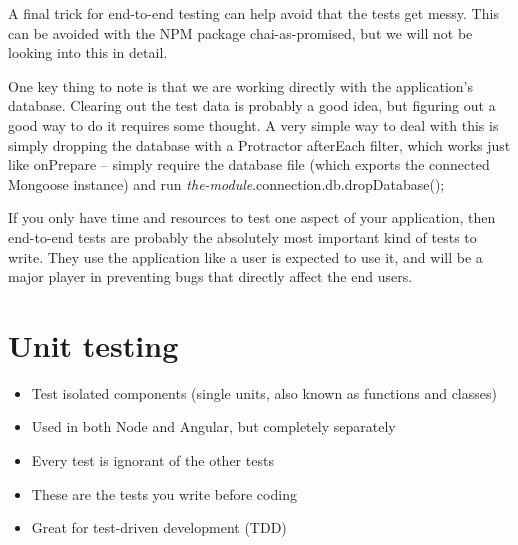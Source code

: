 \documentclass[british]{article}
\begin{document}
A final trick for end-to-end testing can help avoid that the tests get messy. This can be avoided with the NPM package chai-as-promised, but we will not be looking into this in detail.

One key thing to note is that we are working directly with the application's database. Clearing out the test data is probably a good idea, but figuring out a good way to do it requires some thought. A very simple way to deal with this is simply dropping the database with a Protractor afterEach filter, which works just like onPrepare – simply require the database file (which exports the connected Mongoose instance) and run \textit{the-module}.connection.db.dropDatabase();

If you only have time and resources to test one aspect of your application, then end-to-end tests are probably the absolutely most important kind of tests to write. They use the application like a user is expected to use it, and will be a major player in preventing bugs that directly affect the end users.

\section{Unit testing}

\begin{itemize}
  \item Test isolated components (single units, also known as functions and classes)
  \item Used in both Node and Angular, but completely separately
  \item Every test is ignorant of the other tests
  \item These are the tests you write before coding
  \item Great for test-driven development (TDD)
\end{itemize}
\end{document}
